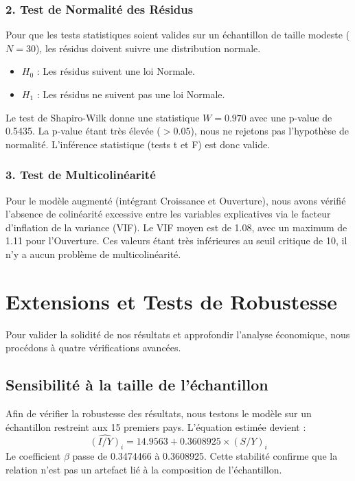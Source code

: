 \documentclass[12pt, a4paper]{article}
\begin{document}
\subsubsection*{2. Test de Normalité des Résidus}
Pour que les tests statistiques soient valides sur un échantillon de taille modeste ($N=30$), les résidus doivent suivre une distribution normale.
\begin{itemize}
    \item $H_0$ : Les résidus suivent une loi Normale.
    \item $H_1$ : Les résidus ne suivent pas une loi Normale.
\end{itemize}
Le test de Shapiro-Wilk donne une statistique $W = 0.970$ avec une p-value de 0.5435.
La p-value étant très élevée ($> 0.05$), nous ne rejetons pas l'hypothèse de normalité. L'inférence statistique (tests t et F) est donc valide.



\subsubsection*{3. Test de Multicolinéarité}
Pour le modèle augmenté (intégrant Croissance et Ouverture), nous avons vérifié l'absence de colinéarité excessive entre les variables explicatives via le facteur d'inflation de la variance (VIF).
Le VIF moyen est de 1.08, avec un maximum de 1.11 pour l'Ouverture. Ces valeurs étant très inférieures au seuil critique de 10, il n'y a aucun problème de multicolinéarité.

\section{Extensions et Tests de Robustesse}

Pour valider la solidité de nos résultats et approfondir l'analyse économique, nous procédons à quatre vérifications avancées.
\subsection{Sensibilité à la taille de l'échantillon}

Afin de vérifier la robustesse des résultats, nous testons le modèle sur un échantillon restreint aux 15 premiers pays.
L'équation estimée devient :
\begin{equation}
\widehat{(I/Y)}_i = 14.9563 + 0.3608925 \times (S/Y)_i
\end{equation}
Le coefficient $\beta$ passe de 0.3474466 à 0.3608925. Cette stabilité confirme que la relation n'est pas un artefact lié à la composition de l'échantillon.
\end{document}
